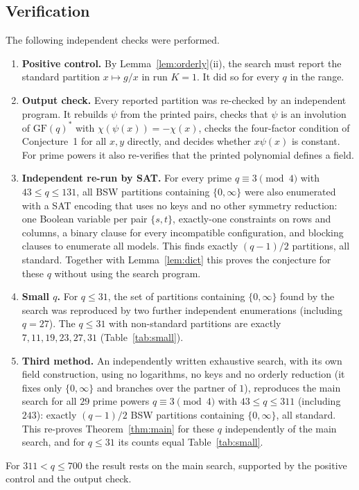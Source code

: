 \documentclass[11pt,a4paper]{article}
\theoremstyle{definition}
\theoremstyle{remark}
\newcommand{\GF}{\mathrm{GF}}
\begin{document}
\subsection{Verification}

The following independent checks were performed.
\begin{enumerate}
\item \textbf{Positive control.} By Lemma~\ref{lem:orderly}(ii), the search must report the standard partition
$x\mapsto g/x$ in run $K=1$. It did so for every $q$ in the range.
\item \textbf{Output check.} Every reported partition was re-checked by an independent program. It rebuilds
$\psi$ from the printed pairs, checks that $\psi$ is an involution of $\GF(q)^*$ with $\chi(\psi(x))=-\chi(x)$,
checks the four-factor condition of Conjecture~1 for all $x,y$ directly, and decides whether $x\psi(x)$ is
constant. For prime powers it also re-verifies that the printed polynomial defines a field.
\item \textbf{Independent re-run by SAT.} For every prime $q\equiv3\pmod4$ with $43\le q\le131$, all BSW
partitions containing $\{0,\infty\}$ were also enumerated with a SAT encoding that uses no keys and no other
symmetry reduction: one Boolean variable per pair $\{s,t\}$, exactly-one constraints on rows and columns, a
binary clause for every incompatible configuration, and blocking clauses to enumerate all models. This finds
exactly $(q-1)/2$ partitions, all standard. Together with Lemma~\ref{lem:dict} this proves the conjecture for
these $q$ without using the search program.
\item \textbf{Small $q$.} For $q\le31$, the set of partitions containing $\{0,\infty\}$ found by the search was
reproduced by two further independent enumerations (including $q=27$). The $q\le31$ with non-standard partitions
are exactly $7,11,19,23,27,31$ (Table~\ref{tab:small}).
\item \textbf{Third method.} An independently written exhaustive search, with its own field construction, using
no logarithms, no keys and no orderly reduction (it fixes only $\{0,\infty\}$ and branches over the partner of
$1$), reproduces the main search for all $29$ prime powers $q\equiv3\pmod4$ with $43\le q\le311$ (including
$243$): exactly $(q-1)/2$ BSW partitions containing $\{0,\infty\}$, all standard. This re-proves
Theorem~\ref{thm:main} for these $q$ independently of the main search, and for $q\le31$ its counts equal
Table~\ref{tab:small}.
\end{enumerate}
For $311<q\le700$ the result rests on the main search, supported by the positive control and the output check.
\end{document}
